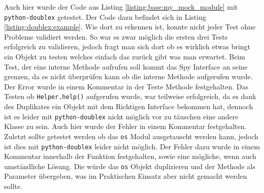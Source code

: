 Auch hier wurde der Code aus Listing \ref{listing:base:my_mock_module} mit \lstinline{python-doublex}
getestet. Der Code dazu befindet sich in Listing \ref{listing:doublex:example}. Wie dort zu erkennen
ist, konnte nicht jeder Test ohne Probleme validiert werden. So war es zwar möglich die ersten drei
Tests erfolgreich zu validieren, jedoch fragt man sich dort ob es wirklich etwas bringt ein Objekt
zu testen welches einfach das zurück gibt was man erwartet. Beim Test, der eine interne Methode
aufrufen soll kommt das Spy Interface an seine grenzen, da es nicht überprüfen kann ob die
interne Methode aufgerufen wurde. Der Error wurde in einem Kommentar in der Teste Methode
festgehalten. Das Testen ob \lstinline{Helper.help()} aufgerufen wurde, war teilweise erfolgreich,
da es dank des Duplikates ein Objekt mit dem Richtigen Interface bekommen hat, dennoch ist es leider
mit \lstinline{python-doublex} nicht möglich vor zu täuschen eine andere Klasse zu sein. Auch hier
wurde der Fehler in einem Kommentar festgehalten. Zuletzt sollte getestet werden ob das \lstinline{os}
Modul ausgetauscht werden kann, jedoch ist dies mit \lstinline{python-doublex} leider nicht möglich.
Der Fehler dazu wurde in einem Kommentar innerhalb der Funktion festgehalten, sowie eine mögliche,
wenn auch umständliche Lösung. Die würde das \lstinline{os} Objekt duplizieren und der Methode als
Parameter übergeben, was im Praktischen Einsatz aber nicht gemacht werden sollte.